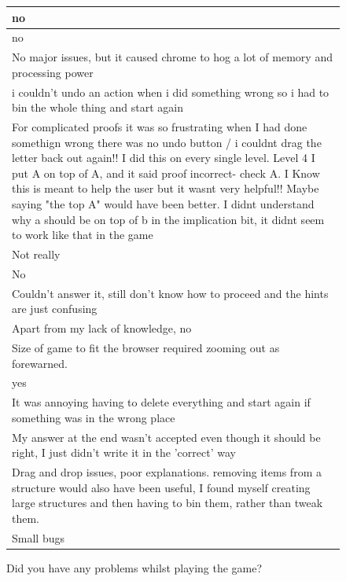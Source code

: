 \begin{figure}[H]
\begin{tabular}{|p{12cm}|} 
\hline
no \\
\hline
no \\
\hline
No major issues, but it caused chrome to hog a lot of memory and processing power \\
\hline
i couldn't undo an action when i did something wrong so i had to bin the whole thing and start again \\
\hline
For complicated proofs it was so frustrating when I had done somethign wrong there was no undo button / i couldnt drag the letter back out again!! I did this on every single level. Level 4 I put A on top of A, and it said proof incorrect- check A. I Know this is meant to help the user but it wasnt very helpful!! Maybe saying "the top A" would have been better. I didnt understand why a should be on top of b in the implication bit, it didnt seem to work like that in the game \\
\hline
Not really \\
\hline
No \\
\hline
Couldn't answer it, still don't know how to proceed and the hints are just confusing \\
\hline
Apart from my lack of knowledge, no \\
\hline
Size of game to fit the browser required zooming out as forewarned. \\
\hline
yes \\
\hline
It was annoying having to delete everything and start again if something was in the wrong place \\
\hline
My answer at the end wasn't accepted even though it should be right, I just didn't write it in the 'correct' way \\
\hline
Drag and drop issues, poor explanations. removing items from a structure would also have been useful, I found myself creating large structures and then having to bin them, rather than tweak them. \\
\hline
Small bugs \\
\hline
\end{tabular}
\caption{Did you have any problems whilst playing the game?}
\end{figure}

